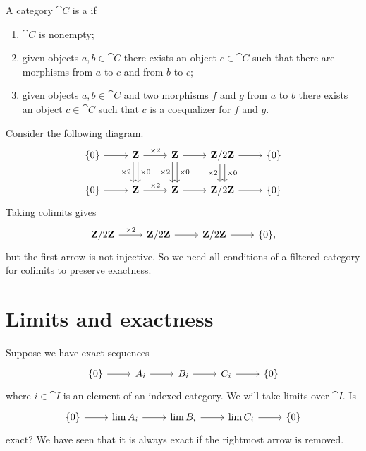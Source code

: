 \documentclass[11pt, oneside,margin=1in]{article}
\begin{document}
\begin{definition}[ ]\label{}
A category $\cat C$ is a  if
\begin{enumerate}
	\item $\cat C$ is nonempty; 
	\item given objects $a, b\in \cat C$ there exists an object $c\in \cat C$ such that there are morphisms from $a$ to $c$ and from $b$ to $c$;
	\item given objects $a, b\in \cat C$ and two morphisms $f$ and $g$ from $a$ to $b$ there exists an object $c\in \cat C$ such that $c$ is a coequalizer for $f$ and $g$.
\end{enumerate}
\end{definition}
\begin{example}[ ]\label{}
Consider the following diagram.
\[
\begin{tikzcd}
	\{0\} \arrow[r] & \Z \arrow[r,"\times 2"] \arrow[d, "\times 2", swap, shift right] \arrow[d, "\times 0", shift left]& \Z \arrow[r] \arrow[d, "\times 2", swap, shift right] \arrow[d, "\times 0", shift left] & \Zmod 2 \arrow[r] \arrow[d, "\times 2", swap, shift right] \arrow[d, "\times 0", shift left] & \{0\}\\
	\{0\} \arrow[r] & \Z \arrow[r,"\times 2"] & \Z\arrow[r]&  \Zmod 2\arrow[r] & \{0\}
\end{tikzcd}
\]
Taking colimits gives 
\[
\begin{tikzcd}
	\Zmod 2 \arrow[r, "\times 2"] & \Zmod 2 \arrow[r] & \Zmod 2 \arrow[r] & \{0\},
\end{tikzcd}
\]
but the first arrow is not injective. So we need all conditions of a filtered category for colimits to preserve exactness.
\end{example}

\section{Limits and exactness}
Suppose we have exact sequences
\[
\begin{tikzcd}
	\{0\} \arrow[r] & A_i \arrow[r] & B_i \arrow[r] & C_i \arrow[r] & \{0\}
\end{tikzcd}
\]
where $i\in \cat I$ is an element of an indexed category. We will take limits over $\cat I$. Is 
\[
\begin{tikzcd}
\{0\} \arrow[r] &\lim A_i \arrow[r] &\lim B_i \arrow[r] &\lim C_i \arrow[r] & \{0\}	
\end{tikzcd}
\]
exact? We have seen that it is always exact if the rightmost arrow is removed. 
\end{document}
